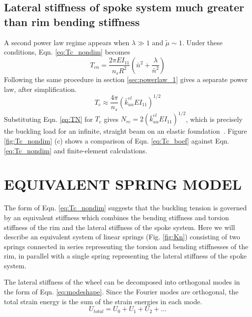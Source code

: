 \documentclass{bmd2016p}
\begin{document}
\subsection{Lateral stiffness of spoke system much greater than rim bending stiffness}
A second power law regime appears when $\lambda \gg 1$ and $\tilde{\mu} \sim 1$. Under these conditions, Eqn. \ref{eq:Tc_nondim} becomes
	\begin{equation}\label{eq:Tcn_boef}
	T_{cn} = \frac{2\pi EI_{11}}{n_sR^2}\left(\bar{n}^2 + \frac{\lambda}{\bar{n}^2} \right)
	\end{equation}
Following the same procedure in section \ref{sec:powerlaw_1} gives a separate power law, after simplification.
	\begin{equation}\label{eq:Tc_boef}
	T_c \approx \frac{4\pi}{n_s} \left(\bar{k}_{uu}^{el}EI_{11} \right)^{1/2} 
	\end{equation}
Substituting Eqn. \ref{eq:TN} for $T_c$ gives $N_{rc}=2\left(\bar{k}_{uu}^{el}EI_{11}\right)^{1/2}$, which is precisely the buckling load for an infinite, straight beam on an elastic foundation~\cite{Hetenyi1946b}. Figure \ref{fig:Tc_nondim} (c) shows a comparison of Eqn. \ref{eq:Tc_boef} against Eqn. \ref{eq:Tc_nondim} and finite-element calculations.



\section{EQUIVALENT SPRING MODEL}
The form of Eqn. \ref{eq:Tc_nondim} suggests that the buckling tension is governed by an equivalent stiffness which combines the bending stiffness and torsion stiffness of the rim and the lateral stiffness of the spoke system. Here we will describe an equivalent system of linear springs (Fig. \ref{fig:Kn}) consisting of two springs connected in series representing the torsion and bending stiffnesses of the rim, in parallel with a single spring representing the lateral stiffness of the spoke system.

The lateral stiffness of the wheel can be decomposed into orthogonal modes in the form of Eqn. \ref{eq:modeshape}. Since the Fourier modes are orthogonal, the total strain energy is the sum of the strain energies in each mode.
	\begin{equation}\label{eq:Umode}
	U_{total} = U_0 + U_1 + U_2 + ...
	\end{equation}
\end{document}
